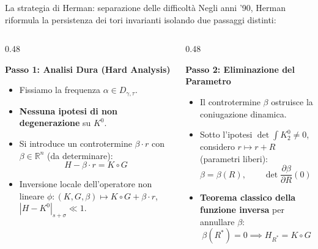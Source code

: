 \documentclass[10pt,aspectratio=169]{beamer}
\newcommand{\R}{\mathbb{R}}
\newcommand{\blu}[1]{\textcolor{UniBlue}{\textbf{#1}}}
\begin{document}
\begin{frame}{La strategia di Herman: separazione delle difficoltà}
  Negli anni '90, Herman riformula la persistenza dei tori invarianti isolando due passaggi distinti:
  \medskip
  \begin{columns}[t]
    \begin{column}{0.48\textwidth}
      \begin{block}{\blu{Passo 1: Analisi Dura (Hard Analysis)}}
        \begin{itemize}
          \item Fissiamo la frequenza $\alpha \in D_{\gamma, \tau}$.
          \item \textbf{Nessuna ipotesi di non degenerazione} su $K^0$.
          \item Si introduce un controtermine $\beta \cdot r$ con \alert{$\beta \in \R^n$} (da determinare):
          \[
            H - \beta \cdot r = K \circ G
          \]
          \item Inversione locale dell'operatore non lineare $\phi : (K, G, \beta) \mapsto K \circ G + \beta \cdot r$, $|H - K^0|_{s + \sigma} \ll 1$.
        \end{itemize}
      \end{block}
    \end{column}
    \pause
    \begin{column}{0.48\textwidth}
      \begin{block}{\blu{Passo 2: Eliminazione del Parametro}}
        \begin{itemize}
          \item Il controtermine $\beta$ ostruisce la coniugazione dinamica.
          \pause
          \item Sotto l'ipotesi $\det \int K^0_2 \neq 0$, considero $r \mapsto r + R$ (parametri liberi):
          \[
            \beta = \beta(R), \qquad \det \frac{\partial \beta}{\partial R}(0) \neq 0
          \]
          \item \textbf{Teorema classico della funzione inversa} per annullare $\beta$:
          \[
            \beta(R^*) = 0 \implies H_{R^*} = K \circ G
          \]
        \end{itemize}
      \end{block}
    \end{column}
  \end{columns}
\end{frame}
\end{document}
